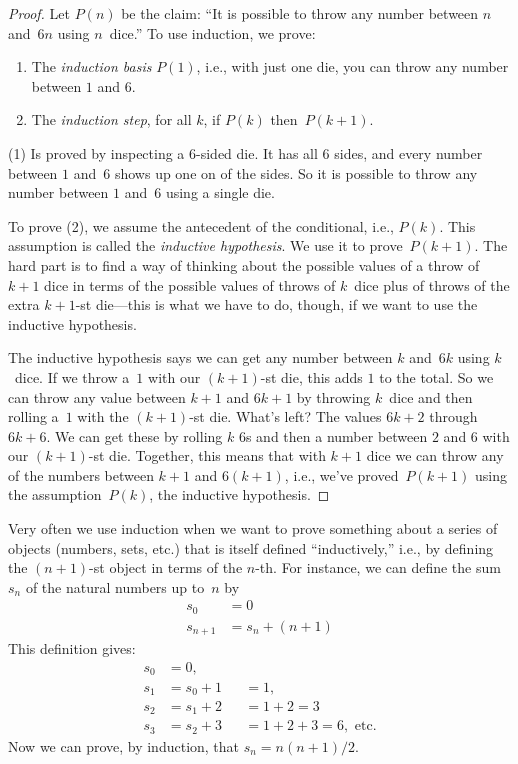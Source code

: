 \documentclass[../../../include/open-logic-section]{subfiles}
\begin{document}
\begin{proof}
Let $P(n)$ be the claim: ``It is possible to throw any number between
$n$ and~$6n$ using $n$~dice.''  To use induction, we prove:
\begin{enumerate}
\item The \emph{induction basis} $P(1)$, i.e., with just one die,
  you can throw any number between $1$ and $6$.
\item The \emph{induction step}, for all $k$, if $P(k)$ then~$P(k+1)$.
\end{enumerate}

(1) Is proved by inspecting a $6$-sided die. It has all 6 sides, and
every number between $1$ and~$6$ shows up one on of the sides. So it
is possible to throw any number between $1$ and~$6$ using a single
die.

To prove (2), we assume the antecedent of the conditional, i.e.,
$P(k)$. This assumption is called the \emph{inductive hypothesis}.  We
use it to prove~$P(k+1)$. The hard part is to find a way of thinking
about the possible values of a throw of $k+1$ dice in terms of the
possible values of throws of $k$~dice plus of throws of the extra
$k+1$-st die---this is what we have to do, though, if we want to use
the inductive hypothesis.

The inductive hypothesis says we can get any number between $k$
and~$6k$ using $k$~dice.  If we throw a~$1$ with our $(k+1)$-st die,
this adds $1$ to the total. So we can throw any value between $k+1$
and $6k+1$ by throwing $k$~dice and then rolling a~$1$ with the
$(k+1)$-st die.  What's left?  The values $6k+2$ through $6k+6$.  We
can get these by rolling $k$ $6$s and then a number between $2$ and
$6$ with our $(k+1)$-st die. Together, this means that with $k+1$ dice
we can throw any of the numbers between $k+1$ and $6(k+1)$, i.e.,
we've proved~$P(k+1)$ using the assumption~$P(k)$, the inductive
hypothesis.
\end{proof}

Very often we use induction when we want to prove something about a
series of objects (numbers, sets, etc.) that is itself defined
``inductively,'' i.e., by defining the $(n+1)$-st object in terms of
the $n$-th.  For instance, we can define the sum~$s_n$ of the natural
numbers up to~$n$ by
\begin{align*}
  s_0 & = 0\\
  s_{n+1} & = s_n + (n+1)
\end{align*}
This definition gives:
\begin{align*}
  s_0 & = 0,\\
  s_1 & = s_0 + 1 && = 1,\\
  s_2 & = s_1 + 2 && = 1 + 2 = 3\\
  s_3 & = s_2 + 3 && = 1 + 2 + 3 = 6, \text{ etc.}
\end{align*}
Now we can prove, by induction, that $s_n = n(n+1)/2$.
\end{document}
